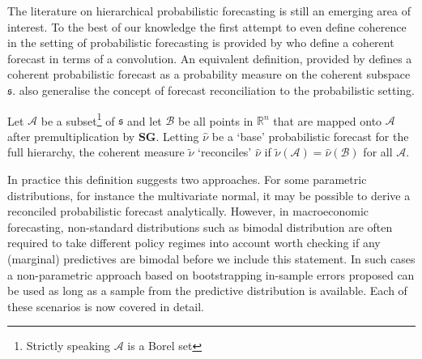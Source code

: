 \documentclass[graybox]{svmult}
\begin{document}

The literature on hierarchical probabilistic forecasting is still an emerging area of interest. %
To the best of our knowledge the first attempt to even define coherence in the setting of probabilistic forecasting is provided by \cite{Taieb2017} who define a coherent forecast in terms of a convolution.  An equivalent definition, provided by \cite{Gamakumara2018} defines a  coherent probabilistic forecast as a probability measure on the coherent subspace $\mathfrak{s}$.  \cite{Gamakumara2018} also generalise the concept of forecast reconciliation to the probabilistic setting.

\begin{definition} Let $\mathcal{A}$ be a subset\footnote{Strictly speaking $\mathcal{A}$ is a Borel set} of $\mathfrak{s}$ and let $\mathcal{B}$ be all points in $\mathbb{R}^n$ that are mapped onto  $\mathcal{A}$ after premultiplication by $\bm{S}\bm{G}$. Letting $\hat{\nu}$ be a `base' probabilistic forecast for the full hierarchy, the coherent measure $\tilde{\nu}$ `reconciles' $\hat{\nu}$ if $\tilde{\nu}(\mathcal{A})=\hat{\nu}(\mathcal{B})$ for all $\mathcal{A}$.
\end{definition}

In practice this definition suggests two approaches.  For some parametric distributions, for instance the multivariate normal, it may be possible to derive a reconciled probabilistic forecast analytically.  However, in macroeconomic forecasting, non-standard distributions such as bimodal distribution are often required to take different policy regimes into account {\color{red} worth checking if any (marginal) predictives are bimodal before we include this statement}.  In such cases a non-parametric approach based on bootstrapping in-sample errors proposed \cite{Gamakumara2018} can be used as long as a sample from the predictive distribution is available.  Each of these scenarios is now covered in detail.
\end{document}

